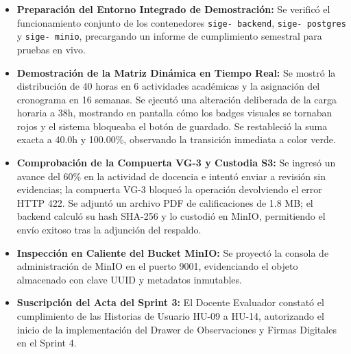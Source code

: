 \documentclass[12pt,a4paper]{article}
\begin{document}
\begin{itemize}[leftmargin=1.5em, itemsep=4pt]
    \item \textbf{Preparación del Entorno Integrado de Demostración:} Se verificó el funcionamiento conjunto de los contenedores \texttt{sige- backend}, \texttt{sige- postgres} y \texttt{sige- minio}, precargando un informe de cumplimiento semestral para pruebas en vivo.
    \item \textbf{Demostración de la Matriz Dinámica en Tiempo Real:} Se mostró la distribución de 40 horas en 6 actividades académicas y la asignación del cronograma en 16 semanas. Se ejecutó una alteración deliberada de la carga horaria a 38h, mostrando en pantalla cómo los badges visuales se tornaban rojos y el sistema bloqueaba el botón de guardado. Se restableció la suma exacta a 40.0h y 100.00\%, observando la transición inmediata a color verde.
    \item \textbf{Comprobación de la Compuerta VG-3 y Custodia S3:} Se ingresó un avance del 60\% en la actividad de docencia e intentó enviar a revisión sin evidencias; la compuerta VG-3 bloqueó la operación devolviendo el error HTTP 422. Se adjuntó un archivo PDF de calificaciones de 1.8 MB; el backend calculó su hash SHA-256 y lo custodió en MinIO, permitiendo el envío exitoso tras la adjunción del respaldo.
    \item \textbf{Inspección en Caliente del Bucket MinIO:} Se proyectó la consola de administración de MinIO en el puerto 9001, evidenciando el objeto almacenado con clave UUID y metadatos inmutables.
    \item \textbf{Suscripción del Acta del Sprint 3:} El Docente Evaluador constató el cumplimiento de las Historias de Usuario HU-09 a HU-14, autorizando el inicio de la implementación del Drawer de Observaciones y Firmas Digitales en el Sprint 4.
\end{itemize}
\end{document}
